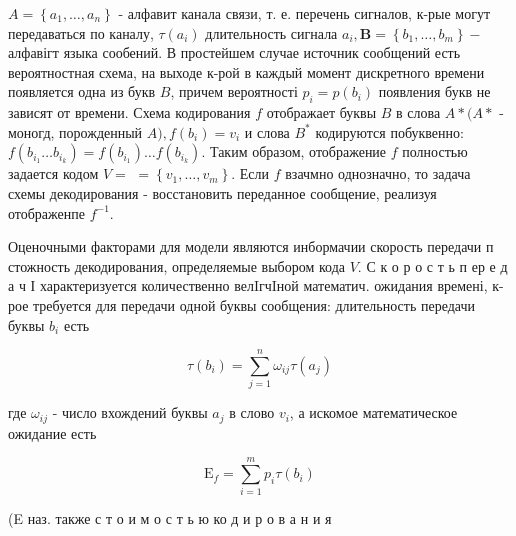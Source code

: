 \documentclass[10pt]{article}
\begin{document}
$A=\left\{a_{1}, \ldots, a_{n}\right\}$ - алфавит канала связи, т. е. перечень сигналов, к-рые могут передаваться по каналу, $\tau\left(a_{i}\right)$ длительность сигнала $a_{i}, \boldsymbol{B}=\left\{b_{1}, \ldots, b_{m}\right\}-$ алфавігт языка сообений. В простейшем случае источник сообщений есть вероятностная схема, на выходе к-рой в каждый момент дискретного времени появляется одна из букв $B$, причем вероятності $p_{i}=p\left(b_{i}\right)$ появления букв не зависят от времени. Схема кодирования $f$ отображает буквы $B$ в слова $A *(A *$ - моногд, порожденный $A), f\left(b_{i}\right)=v_{i}$ и слова $B^{*}$ кодируются побуквенно: $f\left(b_{i_{1}} \ldots b_{i_{k}}\right)=f\left(b_{i_{1}}\right) \ldots f\left(b_{i_{k}}\right)$. Таким образом, отображение $f$ полностью задается кодом $V=$ $=\left\{v_{1}, \ldots, v_{m}\right\}$. Если $f$ взачмно однозначно, то задача схемы декодирования - восстановить переданное сообщение, реализуя отображенпе $f^{-1}$.



Оценочными факторами для модели являются инбормачии скорость передачи п стожность декодирования, определяемые выбором кода $V$. С к о р о с т ь п ер е д а ч І характеризуется количественно велIгчIной математич. ожидания времені, к-рое требуется для передачи одной буквы сообщения: длительность передачи буквы $b_{i}$ есть



\[

\tau\left(b_{i}\right)=\sum_{j=1}^{n} \omega_{i j} \tau\left(a_{j}\right)

\]



где $\omega_{i j}$ - число вхождений буквы $a_{j}$ в слово $v_{i}$, а искомое математическое ожидание есть



\[

\mathrm{E}_{f}=\sum_{i=1}^{m} p_{i} \tau\left(b_{i}\right)

\]



(E наз. также с т о и м о с т ь ю ко д и р о в а н и я
\end{document}
